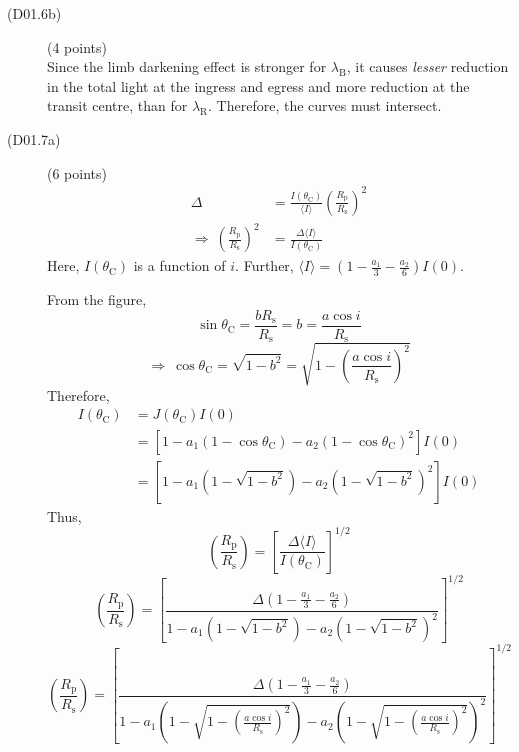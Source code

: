 \begin{description}
\item[(D01.6b)] \hfill(4 points)\\
Since the limb darkening effect is stronger for $\lambda_{\mathrm{B}}$, it
causes \textit{lesser} reduction in the total light at the ingress and egress
and more reduction at the transit centre, than for $\lambda_{\mathrm{R}}$.
Therefore, the curves must intersect.

\item[(D01.7a)] \hfill(6 points)
\begin{align*}
\Delta &= \frac{I(\theta_{\mathrm{C}})}{\langle I\rangle}
  \left(\frac{R_{\mathrm{p}}}{R_{\mathrm{s}}}\right)^2\\
\Longrightarrow\ \left(\frac{R_{\mathrm{p}}}{R_{\mathrm{s}}}\right)^2
  &= \frac{\Delta\langle I\rangle}{I(\theta_{\mathrm{C}})}
\end{align*}
Here, $I(\theta_{\mathrm{C}})$ is a function of $i$. Further,
$\langle I\rangle = \left(1-\frac{a_1}{3}-\frac{a_2}{6}\right)I(0)$.

From the figure,
\[ \sin\theta_{\mathrm{C}} = \frac{bR_{\mathrm{s}}}{R_{\mathrm{s}}} = b
   = \frac{a\cos i}{R_{\mathrm{s}}} \]
\[ \Longrightarrow\ \cos\theta_{\mathrm{C}} = \sqrt{1-b^2}
   = \sqrt{1-\left(\frac{a\cos i}{R_{\mathrm{s}}}\right)^2} \]
Therefore,
\begin{align*}
I(\theta_{\mathrm{C}}) &= J(\theta_{\mathrm{C}})I(0)\\
  &= \left[1 - a_1(1-\cos\theta_{\mathrm{C}})
    - a_2(1-\cos\theta_{\mathrm{C}})^2\right]I(0)\\
  &= \left[1 - a_1\left(1-\sqrt{1-b^2}\right)
    - a_2\left(1-\sqrt{1-b^2}\right)^2\right]I(0)
\end{align*}
Thus,
\[ \left(\frac{R_{\mathrm{p}}}{R_{\mathrm{s}}}\right)
   = \left[\frac{\Delta\langle I\rangle}{I(\theta_{\mathrm{C}})}\right]^{1/2} \]
\[ \left(\frac{R_{\mathrm{p}}}{R_{\mathrm{s}}}\right)
   = \left[\frac{\Delta\left(1-\frac{a_1}{3}-\frac{a_2}{6}\right)}
   {1 - a_1\left(1-\sqrt{1-b^2}\right)
    - a_2\left(1-\sqrt{1-b^2}\right)^2}\right]^{1/2} \]
\[ \left(\frac{R_{\mathrm{p}}}{R_{\mathrm{s}}}\right)
   = \left[\frac{\Delta\left(1-\frac{a_1}{3}-\frac{a_2}{6}\right)}
   {1 - a_1\left(1-\sqrt{1-\left(\frac{a\cos i}{R_{\mathrm{s}}}\right)^2}\right)
    - a_2\left(1-\sqrt{1-\left(\frac{a\cos i}{R_{\mathrm{s}}}\right)^2}\right)^{2}}
   \right]^{1/2} \]


\end{description}
